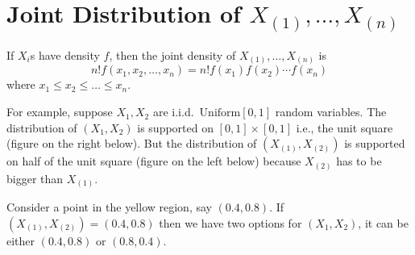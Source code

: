 \section{Joint Distribution of $X_{(1)},\ldots,X_{(n)}$}

If $X_i$s have density $f$, then the joint density of $X_{(1)},\ldots,X_{(n)}$ is 
\[
n! f(x_1,x_2,\ldots,x_n) = n! f(x_1) f(x_2) \cdots f(x_n)
\]
where $x_1\leq x_2\leq \ldots\leq x_n$.

For example, suppose $X_1,X_2$ are i.i.d.\ $\mathrm{Uniform}[0,1]$ random variables. The distribution of $(X_1,X_2)$ is supported on $[0,1]\times[0,1]$ i.e., the unit square (figure on the right below). But the distribution of $(X_{(1)},X_{(2)})$ is supported on half of the unit square (figure on the left below) because $X_{(2)}$ has to be bigger than $X_{(1)}$.
\begin{figure}[h]
\begin{subfigure}{0.5\textwidth}
\centering
{}
\end{subfigure}%
\begin{subfigure}{0.5\textwidth}
\centering
{}    
\end{subfigure}
\end{figure}
\noindent Consider a point in the yellow region, say $(0.4,0.8)$. If $(X_{(1)},X_{(2)})=(0.4,0.8)$ then we have two options for $(X_1,X_2)$, it can be either $(0.4,0.8)$ or $(0.8,0.4)$.
\begin{figure}[h]
\begin{subfigure}{0.5\textwidth}
\centering
{}
\end{subfigure}%
\begin{subfigure}{0.5\textwidth}
\centering
{}
\end{subfigure}
\end{figure}
